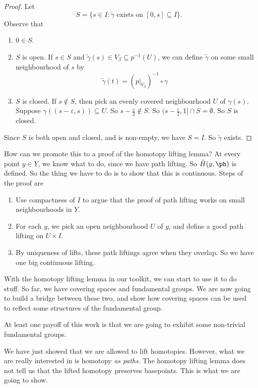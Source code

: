 \documentclass[a4paper]{article}
\begin{document}
\begin{proof}
  Let
  \[
    S = \{s \in I: \tilde{\gamma}\text{ exists on }[0, s] \subseteq I\}.
  \]
  Observe that
  \begin{enumerate}
    \item $0\in S$.
    \item $S$ is open. If $s\in S$ and $\tilde{\gamma}(s) \in V_\beta \subseteq p^{-1}(U)$, we can define $\tilde{\gamma}$ on some small neighbourhood of $s$ by
      \[
        \tilde{\gamma}(t) = (p|_{V_\beta})^{-1}\circ \gamma
      \]

    \item $S$ is closed. If $s \not \in S$, then pick an evenly covered neighbourhood $U$ of $\gamma(s)$. Suppose $\gamma((s - \varepsilon, s)) \subseteq U$. So $s - \frac{\varepsilon}{2} \not \in S$. So $(s - \frac{\varepsilon}{2}, 1] \cap S = \emptyset$. So $S$ is closed.
  \end{enumerate}
  Since $S$ is both open and closed, and is non-empty, we have $S = I$. So $\tilde{\gamma}$ exists.
\end{proof}
How can we promote this to a proof of the homotopy lifting lemma? At every point $y\in Y$, we know what to do, since we have path lifting. So $\tilde{H}(y, \ph)$ is defined. So the thing we have to do is to show that this is continuous. Steps of the proof are
\begin{enumerate}
  \item Use compactness of $I$ to argue that the proof of path lifting works on small neighbourhoods in $Y$.
  \item For each $y$, we pick an open neighbourhood $U$ of $y$, and define a good path lifting on $U\times I$.
  \item By uniqueness of lifts, these path liftings agree when they overlap. So we have one big continuous lifting.
\end{enumerate}

With the homotopy lifting lemma in our toolkit, we can start to use it to do stuff. So far, we have covering spaces and fundamental groups. We are now going to build a bridge between these two, and show how covering spaces can be used to reflect some structures of the fundamental group.

At least one payoff of this work is that we are going to exhibit some non-trivial fundamental groups.

We have just showed that we are allowed to lift homotopies. However, what we are really interested in is homotopy \emph{as paths}. The homotopy lifting lemma does not tell us that the lifted homotopy preserves basepoints. This is what we are going to show.
\end{document}
